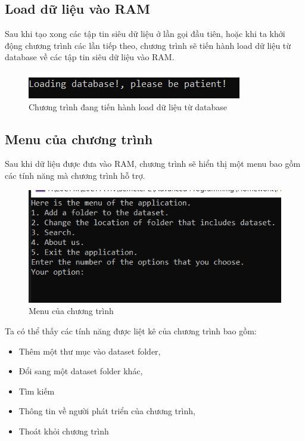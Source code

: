 \documentclass[12pt,a4paper]{article}
\begin{document}
\subsection{Load dữ liệu vào RAM}
Sau khi tạo xong các tập tin siêu dữ liệu ở lần gọi đầu tiên, hoặc khi ta khởi động chương trình các lần tiếp theo, chương trình sẽ tiến hành load dữ liệu từ database về các tập tin siêu dữ liệu vào RAM.
\begin{figure}[H]
\begin{center}
\includegraphics[scale=2]{Fig17}
\end{center}
\caption{Chương trình đang tiến hành load dữ liệu từ database}
\label{Fig17}
\end{figure}
\subsection{Menu của chương trình}
Sau khi dữ liệu được đưa vào RAM, chương trình sẽ hiển thị một menu bao gồm các tính năng mà chương trình hỗ trợ.
\begin{figure}[H]
\begin{center}
\includegraphics[scale=1]{Fig18}
\end{center}
\caption{Menu của chương trình}
\end{figure}
Ta có thể thấy các tính năng được liệt kê của chương trình bao gồm:
\begin{itemize}
\item Thêm một thư mục vào dataset folder,
\item Đổi sang một dataset folder khác,
\item Tìm kiếm
\item Thông tin về người phát triển của chương trình,
\item Thoát khỏi chương trình
\end{itemize}
\end{document}
